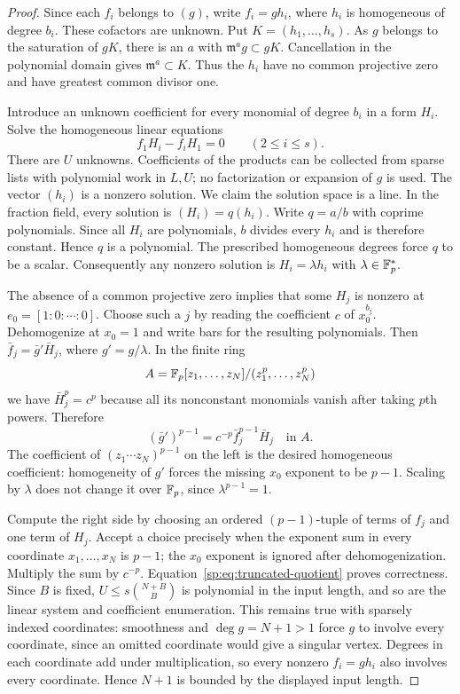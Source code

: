 \begin{proof}
Since each $f_i$ belongs to $(g)$, write $f_i=g h_i$, where $h_i$ is
homogeneous of degree $b_i$. These cofactors are unknown. Put
$K=(h_1,\ldots,h_s)$. As $g$ belongs to the saturation of $gK$, there
is an $a$ with $\mathfrak m^a g\subset gK$. Cancellation in the
polynomial domain gives $\mathfrak m^a\subset K$. Thus the $h_i$
have no common projective zero and have greatest common divisor one.

Introduce an unknown coefficient for every monomial of degree $b_i$
in a form $H_i$. Solve the homogeneous linear equations
\begin{equation}
 f_1 H_i-f_i H_1=0\qquad(2\leq i\leq s).
 \label{sp:eq:cofactor-system}
\end{equation}
There are $U$ unknowns. Coefficients of the products can be collected
from sparse lists with polynomial work in $L,U$; no factorization or
expansion of $g$ is used. The vector $(h_i)$ is a nonzero solution.
We claim the solution space is a line. In the fraction field, every
solution is $(H_i)=q(h_i)$. Write $q=a/b$ with coprime polynomials.
Since all $H_i$ are polynomials, $b$ divides every $h_i$ and is therefore
constant. Hence $q$ is a polynomial. The prescribed homogeneous degrees
force $q$ to be a scalar. Consequently any nonzero solution is
$H_i=\lambda h_i$ with $\lambda\in\mathbb F_p^*$.

The absence of a common projective zero implies that some $H_j$ is
nonzero at $e_0=[1:0:\cdots:0]$. Choose such a $j$ by reading the
coefficient $c$ of $x_0^{b_j}$. Dehomogenize at $x_0=1$ and write bars
for the resulting polynomials. Then $\bar f_j=\bar g'\bar H_j$,
where $g'=g/\lambda$.
In the finite ring
\[
 A=\mathbb F_p[z_1,\ldots,z_N]/(z_1^p,\ldots,z_N^p)
\]
we have $\bar H_j^p=c^p$ because all its nonconstant monomials vanish
after taking $p$th powers. Therefore
\begin{equation}
 (\bar g')^{p-1}
   =c^{-p}\bar f_j^{p-1}\bar H_j\quad\text{in }A.
 \label{sp:eq:truncated-quotient}
\end{equation}
The coefficient of $(z_1\cdots z_N)^{p-1}$ on the left is the desired
homogeneous coefficient: homogeneity of $g'$ forces the missing
$x_0$ exponent to be $p-1$. Scaling by $\lambda$ does not change it
over $\mathbb F_p$, since $\lambda^{p-1}=1$.

Compute the right side by choosing an ordered $(p-1)$-tuple of terms
of $f_j$ and one term of $H_j$. Accept a choice precisely when the
exponent sum in every coordinate $x_1,\ldots,x_N$ is $p-1$; the
$x_0$ exponent is ignored after dehomogenization. Multiply the sum by
$c^{-p}$. Equation~\eqref{sp:eq:truncated-quotient} proves correctness.
Since $B$ is fixed, $U\leq s\binom{N+B}{B}$ is polynomial in the input
length, and so are the linear system and coefficient enumeration.
This remains true with sparsely indexed coordinates: smoothness and
$\deg g=N+1>1$ force $g$ to involve every coordinate, since an omitted
coordinate would give a singular vertex. Degrees in each coordinate
add under multiplication, so every nonzero $f_i=g h_i$ also involves
every coordinate. Hence $N+1$ is bounded by the displayed input length.
\end{proof}

